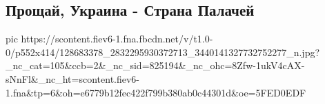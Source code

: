  
 
 
 
 

\subsection{Прощай, Украина - Страна Палачей}

\ifcmt
pic https://scontent.fiev6-1.fna.fbcdn.net/v/t1.0-0/p552x414/128683378_2832295930372713_3440141327732752277_n.jpg?_nc_cat=105&ccb=2&_nc_sid=825194&_nc_ohc=8Zfw-1ukV4cAX-sNnFl&_nc_ht=scontent.fiev6-1.fna&tp=6&oh=e6779b12fec422f799b380ab0c44301d&oe=5FED0EDF
\fi
